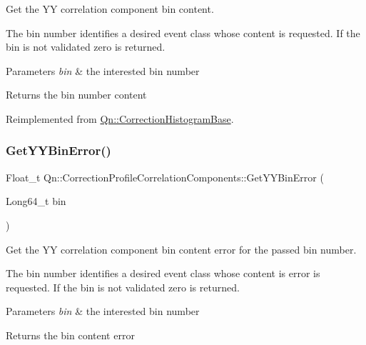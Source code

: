 Get the YY correlation component bin content.

The bin number identifies a desired event class whose content is requested. If the bin is not validated zero is returned.


\begin{DoxyParams}{Parameters}
{\em bin} & the interested bin number \\
\hline
\end{DoxyParams}
\begin{DoxyReturn}{Returns}
the bin number content 
\end{DoxyReturn}


Reimplemented from \mbox{\hyperlink{classQn_1_1CorrectionHistogramBase_a1ebb8ccb23cce80b276670617f4c03e5}{Qn\+::\+Correction\+Histogram\+Base}}.

\mbox{\label{classQn_1_1CorrectionProfileCorrelationComponents_a4952dd516dbd12a66c7a385cbc51cc6b}} 
\subsubsection{\texorpdfstring{Get\+Y\+Y\+Bin\+Error()}{GetYYBinError()}}
{\footnotesize\ttfamily Float\+\_\+t Qn\+::\+Correction\+Profile\+Correlation\+Components\+::\+Get\+Y\+Y\+Bin\+Error (\begin{DoxyParamCaption}\item[{Long64\+\_\+t}]{bin }\end{DoxyParamCaption})\hspace{0.3cm}{\ttfamily [virtual]}}

Get the YY correlation component bin content error for the passed bin number.

The bin number identifies a desired event class whose content is error is requested. If the bin is not validated zero is returned.


\begin{DoxyParams}{Parameters}
{\em bin} & the interested bin number \\
\hline
\end{DoxyParams}
\begin{DoxyReturn}{Returns}
the bin content error 
\end{DoxyReturn}


